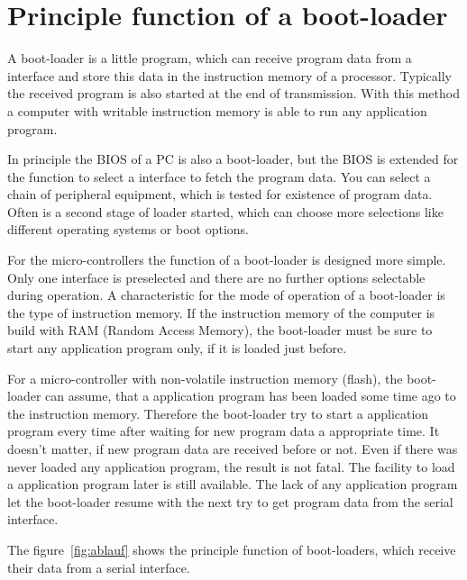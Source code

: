 \chapter{Principle function of a boot-loader}

A boot-loader is a little program, which can receive program data
from a interface and store this data in the instruction memory 
of a processor.
Typically the received program is also started at the end of transmission.
With this method a computer with writable instruction memory
is able to run any application program.

In principle the BIOS of a PC is also a boot-loader,
but the BIOS is extended for the function
to select a interface to fetch the program data.
You can select a chain of peripheral equipment, which is tested
for existence of program data.
Often is a second stage of loader started, which can
choose more selections like different operating systems or
boot options.


For the micro-controllers the function of a boot-loader is designed
more simple. Only one interface is preselected and there are no
further options selectable during operation.
A characteristic for the mode of operation of a boot-loader
is the type of instruction memory. If the instruction memory
of the computer is build with RAM (Random Access Memory),
the boot-loader must be sure to start any application program
only, if it is loaded just before.

For a micro-controller with non-volatile instruction memory (flash),
the boot-loader can assume, that a application program has
been loaded some time ago to the instruction memory.
Therefore the boot-loader try to start a application program every time
after waiting for new program data a appropriate time.
It doesn't matter, if new program data are received before or not.
Even if there was never loaded any application program,
the result is not fatal.
The facility to load a application program later is
still available.
The lack of any application program let the boot-loader resume
with the next try to get program data from the serial interface.

The figure~\ref{fig:ablauf} shows the principle function of
boot-loaders, which receive their data from a serial interface.

